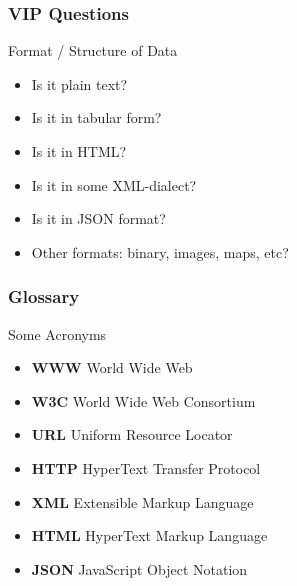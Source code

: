 \documentclass{beamer}\usepackage[]{graphicx}\usepackage[]{color}
\begin{document}
\begin{frame}
\frametitle{VIP Questions}

\begin{block}{Format / Structure of Data}
 \begin{itemize}
  \item Is it plain text? \\
  \item Is it in tabular  form? \\
  \item Is it in HTML? \\
  \item Is it in some XML-dialect?
  \item Is it in JSON format?
  \item Other formats: binary, images, maps, etc?
 \end{itemize}
\end{block}

\end{frame}


\begin{frame}
\frametitle{Glossary}

\begin{block}{Some Acronyms}
 \begin{itemize}
  \item \textbf{WWW} World Wide Web
  \item \textbf{W3C} World Wide Web Consortium
  \item \textbf{URL} Uniform Resource Locator
  \item \textbf{HTTP} HyperText Transfer Protocol
  \item \textbf{XML} Extensible Markup Language
  \item \textbf{HTML} HyperText Markup Language
  \item \textbf{JSON} JavaScript Object Notation
 \end{itemize}
\end{block}

\end{frame}

\end{document}
